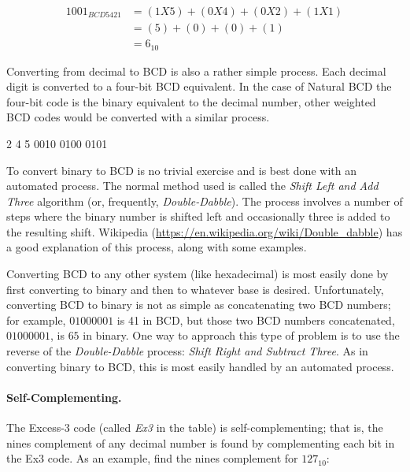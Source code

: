 \begin{align}
  1001_{BCD5421} &= (1X5)+(0X4)+(0X2)+(1X1) \\
  \nonumber
  &= (5)+(0)+(0)+(1) \\
  \nonumber
  &= 6_{10}
\end{align}

Converting from decimal to \ac{BCD} is also a rather simple process. Each decimal digit is converted to a four-bit \ac{BCD} equivalent. In the case of Natural \ac{BCD} the four-bit code is the binary equivalent to the decimal number, other weighted \ac{BCD} codes would be converted with a similar process.

\begin{binDisp}
      2    4    5
    0010 0100 0101
\end{binDisp}


To convert binary to \ac{BCD} is no trivial exercise and is best done with an automated process. The normal method used is called the \emph{Shift Left and Add Three} algorithm (or, frequently, \emph{Double-Dabble}). The process involves a number of steps where the binary number is shifted left and occasionally three is added to the resulting shift. Wikipedia (\url{https://en.wikipedia.org/wiki/Double_dabble}) has a good explanation of this process, along with some examples.

Converting \ac{BCD} to any other system (like hexadecimal) is most easily done by first converting to binary and then to whatever base is desired. Unfortunately, converting \ac{BCD} to binary is not as simple as concatenating two \ac{BCD} numbers; for example, $ 0100 0001 $ is 41 in \ac{BCD}, but those two \ac{BCD} numbers concatenated, $ 01000001 $, is $ 65 $ in binary. One way to approach this type of problem is to use the reverse of the \emph{Double-Dabble} process: \emph{Shift Right and Subtract Three}. As in converting binary to \ac{BCD}, this is most easily handled by an automated process.

\paragraph{Self-Complementing.} The Excess-3 code (called \emph{Ex3} in the table) is self-complementing; that is, the nines complement of any decimal number is found by complementing each bit in the Ex3 code. As an example, find the nines complement for $ 127_{10} $:

